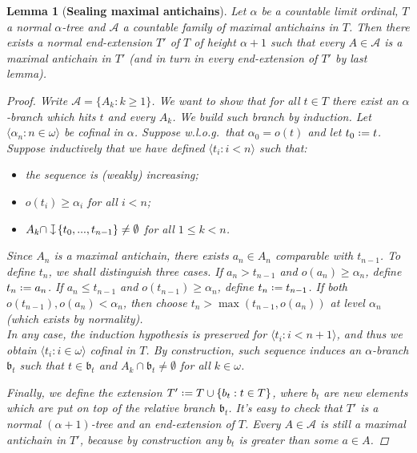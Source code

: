 \documentclass[11pt,a4paper]{report}
\newtheorem{lemma}[theorem]{Lemma}
\theoremstyle{definition}
\theoremstyle{num.custom-title}
\theoremstyle{custom-title}
\newcommand{\A}{\mathcal{A}}
\newcommand{\downmapsto}{%
           \mathrel{\raisebox{.1em}{%
							\rotatebox[origin=c]{-90}{$\mapsto$}}}}
\newcommand*{\defeq}{\mathrel{\rlap{%
                     \raisebox{0.3ex}{$\cdot$}}%
                     \raisebox{-0.3ex}{$\cdot$}}%
                     =}
\begin{document}
\begin{lemma}[\textbf{Sealing maximal antichains}]\label{lemma-kill_countable_max_antichains}
Let $\alpha$ be a countable limit ordinal, $T$ a normal $\alpha$-tree and $\A$ a countable family of maximal antichains in $T$. Then there exists a normal end-extension $T'$ of $T$ of height $\alpha+1$ such that every $A \in \A$ is a maximal antichain in $T'$ (and in turn in every end-extension of $T'$ by last lemma).
\begin{proof}
Write $\A = \{A_k : k \geq 1 \}$. We want to show that for all $t \in T$ there exist an $\alpha$-branch which hits $t$ and every $A_k$. We build such branch by induction. Let $\langle \alpha_n : n \in \omega \rangle$ be cofinal in $\alpha$. Suppose w.l.o.g.\ that $\alpha_0 = o(t)$ and let $t_0 \defeq t$. Suppose inductively that we have defined $\langle t_i : i < n \rangle$ such that:
\begin{itemize}
\item the sequence is (weakly) increasing;
\item $o(t_i) \geq \alpha_i$ for all $i<n$;
\item $A_k \cap \downmapsto \{t_0,...,t_{n-1}\} \neq \emptyset$ for all $1 \leq k < n$.
\end{itemize}
Since $A_n$ is a maximal antichain, there exists $a_n \in A_n$ comparable with $t_{n-1}$. To define $t_n$, we shall distinguish three cases. If $a_n > t_{n-1}$ and $o(a_n) \geq \alpha_n$, define $t_n \defeq a_n$. If $a_n \leq t_{n-1}$ and $o(t_{n-1}) \geq \alpha_n$, define $t_n \defeq t_{n-1}$. If both $o(t_{n-1}), o(a_n) < \alpha_n$, then choose $t_n > \max(t_{n-1},o(a_n))$ at level $\alpha_n$ (which exists by normality).\\
In any case, the induction hypothesis is preserved for $\langle t_i : i < n+1 \rangle$, and thus we obtain $\langle t_i : i \in \omega \rangle$ cofinal in $T$. By construction, such sequence induces an $\alpha$-branch $\mathfrak{b}_t$ such that $t \in \mathfrak{b}_t$ and $A_k \cap \mathfrak{b}_t \neq \emptyset$ for all $k \in \omega$.

Finally, we define the extension $T' \defeq T \cup \{ b_t : t \in T\}$, where $b_t$ are new elements which are put on top of the relative branch $\mathfrak{b}_t$. It's easy to check that $T'$ is a normal $(\alpha+1)$-tree and an end-extension of $T$. Every $A \in \A$ is still a maximal antichain in $T'$, because by construction any $b_t$ is greater than some $a \in A$.
\end{proof}
\end{lemma}
\end{document}
